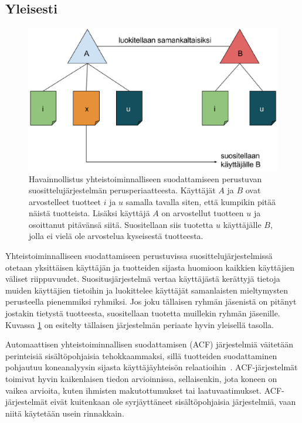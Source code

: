 \documentclass[12pt,finnish]{tktltiki2}
\theoremstyle{definition}
\theoremstyle{remark}
\begin{document}
\subsection{Yleisesti}
\begin{figure}[]
\includegraphics[width = 390pt]{yhteistoiminnallinen.eps}\caption{Havainnollistus yhteistoiminnalliseen suodattamiseen perustuvan suosittelujärjestelmän perusperiaatteesta. Käyttäjät $A$ ja $B$ ovat arvostelleet tuotteet $i$ ja $u$ samalla tavalla siten, että kumpikin pitää näistä tuotteista. Lisäksi käyttäjä $A$ on arvostellut tuotteen $u$ ja osoittanut pitävänsä siitä. Suositellaan siis tuotetta $u$ käyttäjälle $B$, jolla ei vielä ole arvostelua kyseisestä tuotteesta.}
\label{yhteistoiminnallinen}
\end{figure}
        Yhteistoiminnalliseen suodattamiseen perustuvissa suosittelujärjestelmissä otetaan yksittäisen käyttäjän ja tuotteiden sijasta huomioon kaikkien käyttäjien väliset riippuvuudet. Suositusjärjestelmä vertaa käyttäjästä kerättyjä tietoja muiden käyttäjien tietoihin ja luokittelee käyttäjät samanlaisten mieltymysten perusteella pienemmiksi ryhmiksi. Jos joku tällaisen ryhmän jäsenistä on pitänyt jostakin tietystä tuotteesta, suositellaan tuotetta muillekin ryhmän jäsenille. Kuvassa \ref{yhteistoiminnallinen} on esitelty tällaisen järjestelmän periaate hyvin yleisellä tasolla.
        
         Automaattisen yhteistoiminnallisen suodattamisen (ACF) järjestelmiä väitetään perinteisiä sisältöpohjaisia tehokkaammaksi, sillä tuotteiden suodattaminen pohjautuu koneanalyysin sijasta käyttäjäyhteisön relaatioihin~\cite{Herlocker:2000:ECF:358916.358995}. ACF-järjestelmät toimivat hyvin kaikenlaisen tiedon arvioinnissa, sellaisenkin, jota koneen on vaikea arvioita, kuten ihmisten makutottumukset tai laatuvaatimukset. ACF-järjestelmät eivät kuitenkaan ole syrjäyttäneet sisältöpohjaisia järjestelmiä, vaan niitä käytetään usein rinnakkain.
         
\end{document}
